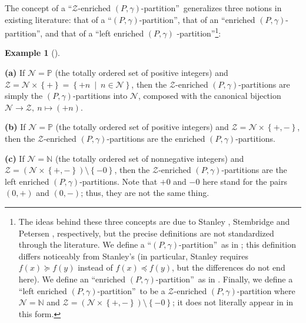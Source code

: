 \documentclass[numbers=enddot,12pt,final,onecolumn,notitlepage]{scrartcl}%
\theoremstyle{definition}
\newtheorem{exmp}[theo]{Example}
\newenvironment{example}[1][]
{\begin{exmp}[#1]\begin{leftbar}}
{\end{leftbar}\end{exmp}}
\begin{document}
The concept of a \textquotedblleft$\mathcal{Z}$-enriched $\left(
P,\gamma\right)  $-partition\textquotedblright\ generalizes three notions in
existing literature: that of a \textquotedblleft$\left(  P,\gamma\right)
$-partition\textquotedblright, that of an \textquotedblleft enriched $\left(
P,\gamma\right)  $-partition\textquotedblright, and that of a
\textquotedblleft left enriched $\left(  P,\gamma\right)  $%
-partition\textquotedblright\footnote{The ideas behind these three concepts
are due to Stanley \cite{Stanle72}, Stembridge \cite[\S 2]{Stembr97} and
Petersen \cite{Peters05}, respectively, but the precise definitions are not
standardized through the literature. We define a \textquotedblleft$\left(
P,\gamma\right)  $-partition\textquotedblright\ as in \cite[\S 1.1]{Stembr97};
this definition differs noticeably from Stanley's (in particular, Stanley
requires $f\left(  x\right)  \succcurlyeq f\left(  y\right)  $ instead of
$f\left(  x\right)  \preccurlyeq f\left(  y\right)  $, but the differences do
not end here). We define an \textquotedblleft enriched $\left(  P,\gamma
\right)  $-partition\textquotedblright\ as in \cite[\S 2]{Stembr97}. Finally,
we define a \textquotedblleft left enriched $\left(  P,\gamma\right)
$-partition\textquotedblright\ to be a $\mathcal{Z}$-enriched $\left(
P,\gamma\right)  $-partition where $\mathcal{N}=\mathbb{N}$ and $\mathcal{Z}%
=\left(  \mathcal{N}\times\left\{  +,-\right\}  \right)  \setminus\left\{
-0\right\}  $; it does not literally appear in \cite[Definition 4.1]{Peters05}
in this form.}:

\begin{example}
\label{exa.ambivPp.abc}\textbf{(a)} If $\mathcal{N}=\mathbb{P}$ (the totally
ordered set of positive integers) and $\mathcal{Z}=\mathcal{N}\times\left\{
+\right\}  =\left\{  +n\ \mid\ n\in\mathcal{N}\right\}  $, then the
$\mathcal{Z}$-enriched $\left(  P,\gamma\right)  $-partitions are simply the
$\left(  P,\gamma\right)  $-partitions into $\mathcal{N}$, composed with the
canonical bijection $\mathcal{N}\rightarrow\mathcal{Z},\ n\mapsto\left(
+n\right)  $.

\textbf{(b)} If $\mathcal{N}=\mathbb{P}$ (the totally ordered set of positive
integers) and $\mathcal{Z}=\mathcal{N}\times\left\{  +,-\right\}  $, then the
$\mathcal{Z}$-enriched $\left(  P,\gamma\right)  $-partitions are the enriched
$\left(  P,\gamma\right)  $-partitions.

\textbf{(c)} If $\mathcal{N}=\mathbb{N}$ (the totally ordered set of
nonnegative integers) and $\mathcal{Z}=\left(  \mathcal{N}\times\left\{
+,-\right\}  \right)  \setminus\left\{  -0\right\}  $, then the $\mathcal{Z}%
$-enriched $\left(  P,\gamma\right)  $-partitions are the left enriched
$\left(  P,\gamma\right)  $-partitions. Note that $+0$ and $-0$ here stand for
the pairs $\left(  0,+\right)  $ and $\left(  0,-\right)  $; thus, they are
not the same thing.
\end{example}
\end{document}
